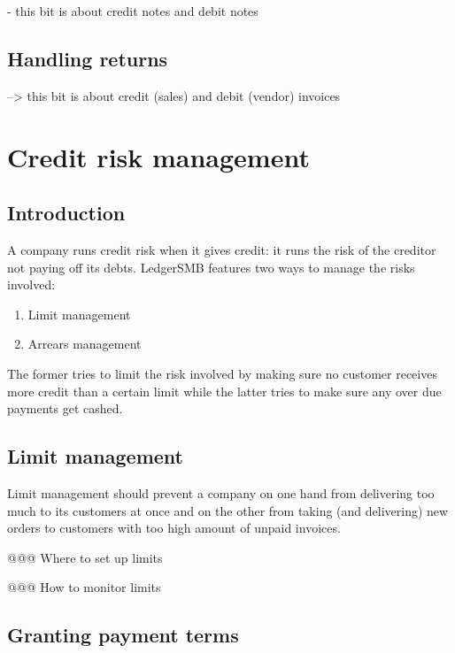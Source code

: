 - this bit is about credit notes and debit notes

\section{Handling returns}
\label{sec-workflows-managing-ar/ap-returns}

--> this bit is about credit (sales) and debit (vendor) invoices

\chapter{Credit risk management}
\label{cha-credit-risk-management}

\section{Introduction}
\label{sec-credit-risk-management-introduction}

A company runs credit risk when it gives credit: it runs the risk of the
creditor not paying off its debts.  LedgerSMB features two ways to manage
the risks involved:

\begin{enumerate}
\item Limit management
\item Arrears management
\end{enumerate}

The former tries to limit the risk involved by making sure no customer
receives more credit than a certain limit while the latter tries to
make sure any over due payments get cashed.

\section{Limit management}
\label{sec-workflows-credit-risk-limit-management}

Limit management should prevent a company on one hand from delivering too much
to its customers at once and on the other from taking (and delivering) new orders
to customers with too high amount of unpaid invoices.



@@@ Where to set up limits

@@@ How to monitor limits



\section{Granting payment terms}
\label{sec-workflows-credit-risk-payment-terms}

